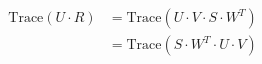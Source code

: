 \documentclass[paper=a5,fontsize=12pt]{scrbook}
\begin{document}
            \begin{preview}

            
            \begin{align*}
            \text{Trace}(U \cdot R) &= \text{Trace}(U \cdot V \cdot S \cdot W^T) \\
                                    &= \text{Trace}(S \cdot W^T \cdot U \cdot V)
            \end{align*}        
        


            \end{preview}
            
\end{document}
